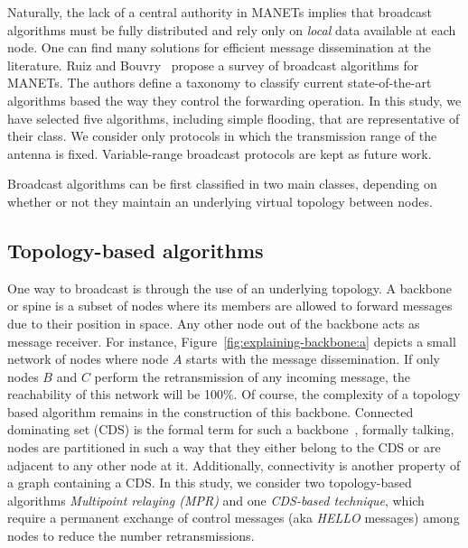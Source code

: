 Naturally, the lack of a central authority in MANETs implies that broadcast algorithms must be fully distributed and rely only on \textit{local} data available at each node. One can find many solutions for efficient message dissemination at the literature.
%
Ruiz and Bouvry~\cite{Ruiz2015} propose a survey of broadcast algorithms for MANETs.
%
The authors define a taxonomy to classify current state-of-the-art algorithms based the way they control the forwarding operation.
%
In this study, we have selected five algorithms, including simple flooding, that are representative of their class.
%
%
We consider only protocols in which the transmission range of the antenna is fixed.
%
Variable-range broadcast protocols are kept as future work.

%
Broadcast algorithms can be first classified in two main classes, depending on whether or not they maintain an underlying virtual topology between nodes.

\subsection{Topology-based algorithms}
One way to broadcast is through the use of an underlying topology.
%
A backbone or spine is a subset of nodes where its members are allowed to forward messages due to their position in space.
%
Any other node out of the backbone acts as message receiver.
%
For instance, Figure~\ref{fig:explaining-backbone:a} depicts a small network of nodes where node $A$ starts with the message dissemination.
%
If only nodes $B$ and $C$ perform the retransmission of any incoming message, the reachability of this network will be 100\%.
%
Of course, the complexity of a topology based algorithm remains in the construction of this backbone.
%
Connected dominating set (CDS) is the formal term for such a backbone~\cite{Wu2001}, formally talking, nodes are partitioned in such a way that they either belong to the CDS or are adjacent to any other node at it. Additionally, connectivity is another property of a graph containing a CDS.
%
In this study, we consider two topology-based algorithms \textit{Multipoint relaying (MPR)} and one \textit{CDS-based technique}, which require a permanent exchange of control messages (aka \textit{HELLO} messages) among nodes to reduce the number retransmissions.

